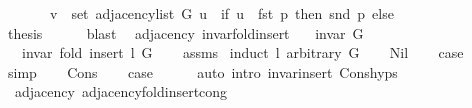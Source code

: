 \begin{isabellebody}
\ \ \ \ \ \ \ v\ {\isasymin}\ set\ {\isacharparenleft}{\kern0pt}adjacency{\isacharunderscore}{\kern0pt}list\ G\ u{\isacharparenright}{\kern0pt}\ {\isasymunion}\ {\isacharparenleft}{\kern0pt}if\ u\ {\isacharequal}{\kern0pt}\ fst\ p\ then\ {\isacharbraceleft}{\kern0pt}snd\ p{\isacharbraceright}{\kern0pt}\ else\ {\isacharbraceleft}{\kern0pt}{\isacharbraceright}{\kern0pt}{\isacharparenright}{\kern0pt}{\isachardoublequoteclose}\isanewline
\ \ \ \ \ \ \isacommand{{\isachardot}{\kern0pt}}\isamarkupfalse%
\ \isacommand{{\isacharbraceright}{\kern0pt}}\isamarkupfalse%
\isanewline
\ \ \isamarkupfalse%
\ {\isacharquery}{\kern0pt}thesis\isanewline
\ \ \ \ \isamarkupfalse%
\ blast\isanewline
{}\isamarkupfalse%
%
\endisatagproof
{\isafoldproof}%
%
\isadelimproof
\isanewline
%
\endisadelimproof
\isanewline
{}\isamarkupfalse%
\ {\isacharparenleft}{\kern0pt}\ adjacency{\isacharparenright}{\kern0pt}\ invar{\isacharunderscore}{\kern0pt}fold{\isacharunderscore}{\kern0pt}insert{\isacharcolon}{\kern0pt}\isanewline
\ \ \ {\isachardoublequoteopen}invar\ G{\isachardoublequoteclose}\isanewline
\ \ \ {\isachardoublequoteopen}invar\ {\isacharparenleft}{\kern0pt}fold\ insert\ l\ G{\isacharparenright}{\kern0pt}{\isachardoublequoteclose}\isanewline
%
\isadelimproof
\ \ %
\endisadelimproof
%
\isatagproof
{}\isamarkupfalse%
\ assms\isanewline
{}\isamarkupfalse%
\ {\isacharparenleft}{\kern0pt}induct\ l\ arbitrary{\isacharcolon}{\kern0pt}\ G{\isacharparenright}{\kern0pt}\isanewline
\ \ \isamarkupfalse%
\ Nil\isanewline
\ \ \isamarkupfalse%
\ {\isacharquery}{\kern0pt}case\isanewline
\ \ \ \ \isamarkupfalse%
\ simp\isanewline
{}\isamarkupfalse%
\isanewline
\ \ \isamarkupfalse%
\ Cons\isanewline
\ \ \isamarkupfalse%
\ {\isacharquery}{\kern0pt}case\isanewline
\ \ \ \ \isamarkupfalse%
\ {\isacharparenleft}{\kern0pt}auto\ intro{\isacharcolon}{\kern0pt}\ invar{\isacharunderscore}{\kern0pt}insert\ Cons{\isachardot}{\kern0pt}hyps{\isacharparenright}{\kern0pt}\isanewline
{}\isamarkupfalse%
%
\endisatagproof
{\isafoldproof}%
%
\isadelimproof
\isanewline
%
\endisadelimproof
\isanewline
{}\isamarkupfalse%
\ {\isacharparenleft}{\kern0pt}\ adjacency{\isacharparenright}{\kern0pt}\ adjacency{\isacharunderscore}{\kern0pt}fold{\isacharunderscore}{\kern0pt}insert{\isacharunderscore}{\kern0pt}cong{\isacharcolon}{\kern0pt}\isanewline

\end{isabellebody}
